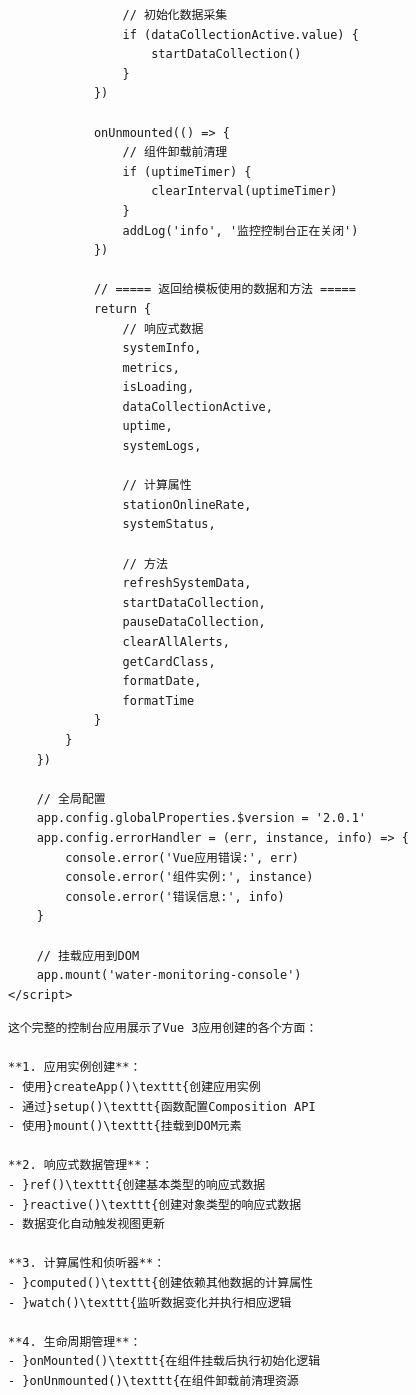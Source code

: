 {{\begin{verbatim}
                // 初始化数据采集
                if (dataCollectionActive.value) {
                    startDataCollection()
                }
            })
            
            onUnmounted(() => {
                // 组件卸载前清理
                if (uptimeTimer) {
                    clearInterval(uptimeTimer)
                }
                addLog('info', '监控控制台正在关闭')
            })
            
            // ===== 返回给模板使用的数据和方法 =====
            return {
                // 响应式数据
                systemInfo,
                metrics,
                isLoading,
                dataCollectionActive,
                uptime,
                systemLogs,
                
                // 计算属性
                stationOnlineRate,
                systemStatus,
                
                // 方法
                refreshSystemData,
                startDataCollection,
                pauseDataCollection,
                clearAllAlerts,
                getCardClass,
                formatDate,
                formatTime
            }
        }
    })
    
    // 全局配置
    app.config.globalProperties.$version = '2.0.1'
    app.config.errorHandler = (err, instance, info) => {
        console.error('Vue应用错误:', err)
        console.error('组件实例:', instance)
        console.error('错误信息:', info)
    }
    
    // 挂载应用到DOM
    app.mount('water-monitoring-console')
</script>
\end{verbatim}

\begin{lstlisting}
这个完整的控制台应用展示了Vue 3应用创建的各个方面：

**1. 应用实例创建**：
- 使用}createApp()\texttt{创建应用实例
- 通过}setup()\texttt{函数配置Composition API
- 使用}mount()\texttt{挂载到DOM元素

**2. 响应式数据管理**：
- }ref()\texttt{创建基本类型的响应式数据
- }reactive()\texttt{创建对象类型的响应式数据
- 数据变化自动触发视图更新

**3. 计算属性和侦听器**：
- }computed()\texttt{创建依赖其他数据的计算属性
- }watch()\texttt{监听数据变化并执行相应逻辑

**4. 生命周期管理**：
- }onMounted()\texttt{在组件挂载后执行初始化逻辑
- }onUnmounted()\texttt{在组件卸载前清理资源


\end{lstlisting}}}
